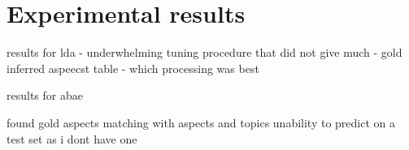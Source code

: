 \section{Experimental results}
results for lda
- underwhelming tuning procedure that did not give much
- gold inferred aspeecst table
- which processing was best

results for abae

found gold aspects matching with aspects and topics
unability to predict on a test set as i dont have one